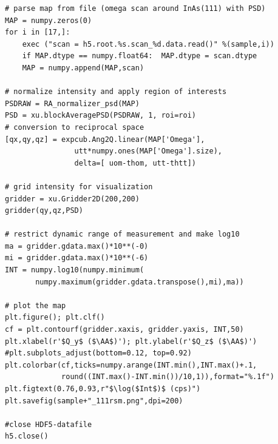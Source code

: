 \begin{lstlisting}[caption={reading a spec-file, saving it to HDF5, reading a particular scan, convert it to reciprocal space, plot it using matplotlib}]
# parse map from file (omega scan around InAs(111) with PSD)
MAP = numpy.zeros(0)
for i in [17,]:
    exec ("scan = h5.root.%s.scan_%d.data.read()" %(sample,i))
    if MAP.dtype == numpy.float64:  MAP.dtype = scan.dtype
    MAP = numpy.append(MAP,scan)
                
# normalize intensity and apply region of interests
PSDRAW = RA_normalizer_psd(MAP)
PSD = xu.blockAveragePSD(PSDRAW, 1, roi=roi)
# conversion to reciprocal space
[qx,qy,qz] = expcub.Ang2Q.linear(MAP['Omega'],
                utt*numpy.ones(MAP['Omega'].size),
                delta=[ uom-thom, utt-thtt])

# grid intensity for visualization
gridder = xu.Gridder2D(200,200)
gridder(qy,qz,PSD)

# restrict dynamic range of measurement and make log10
ma = gridder.gdata.max()*10**(-0)
mi = gridder.gdata.max()*10**(-6)
INT = numpy.log10(numpy.minimum(
       numpy.maximum(gridder.gdata.transpose(),mi),ma))

# plot the map
plt.figure(); plt.clf()
cf = plt.contourf(gridder.xaxis, gridder.yaxis, INT,50)
plt.xlabel(r'$Q_y$ ($\AA$)'); plt.ylabel(r'$Q_z$ ($\AA$)')
#plt.subplots_adjust(bottom=0.12, top=0.92)
plt.colorbar(cf,ticks=numpy.arange(INT.min(),INT.max()+.1,
             round((INT.max()-INT.min())/10,1)),format="%.1f")
plt.figtext(0.76,0.93,r"$\log($Int$)$ (cps)") 
plt.savefig(sample+"_111rsm.png",dpi=200)

#close HDF5-datafile
h5.close()
\end{lstlisting}
